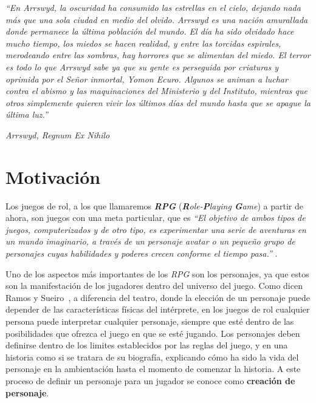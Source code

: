 

\vspace*{\fill}
\epigraph{\textit{“En Arrswyd, la oscuridad ha consumido las estrellas en el cielo, 
dejando nada más que una sola ciudad en medio del olvido. Arrswyd es una nación amurallada 
donde permanece la última población del mundo. El día ha sido olvidado hace mucho tiempo, 
los miedos se hacen realidad, y entre las torcidas espirales, merodeando entre las sombras, 
hay horrores que se alimentan del miedo. El terror es todo lo que Arrswyd sabe ya que su gente 
es perseguida por criaturas y oprimida por el Señor inmortal, Yomon Ecuro. Algunos se animan a 
luchar contra el abismo y las maquinaciones del Ministerio y del Instituto, mientras que otros 
simplemente quieren vivir los últimos días del mundo hasta que se apague la última luz.”}}{\textit{Arrswyd, Regnum Ex Nihilo}}
\vspace*{\fill}

\newpage

\section{Motivación}
Los juegos de rol, a los que llamaremos \textbf{\textit{RPG}} (\textit{\textbf{R}ole-\textbf{P}laying \textbf{G}ame}) a 
partir de ahora, son juegos con una meta particular, que es \textit{“El objetivo de ambos tipos de juegos, computerizados y 
de otro tipo, es experimentar una serie de aventuras en un mundo imaginario, a través de un personaje avatar o un pequeño grupo de 
personajes cuyas habilidades y poderes crecen conforme el tiempo pasa.”} \autocite*{Adams2010}. 

Uno de los aspectos más importantes de los \textit{RPG} son los personajes, ya que estos son la manifestación de los jugadores 
dentro del universo del juego. Como dicen Ramos y Sueiro~\autocite*{Ramos-Villagrasa2010}, a diferencia del teatro, donde la elección de un personaje puede depender de las características 
físicas del intérprete, en los juegos de rol cualquier persona puede interpretar cualquier personaje, siempre que esté dentro de las 
posibilidades que ofrezca el juego en que se esté jugando. Los personajes deben definirse dentro de los limites establecidos por 
las reglas del juego, y en una historia como si se tratara de su biografía, explicando cómo ha sido la vida del personaje en 
la ambientación hasta el momento de comenzar la historia. A este proceso de definir un personaje 
para un jugador se conoce como \textbf{creación de personaje}. \medskip

